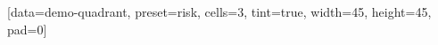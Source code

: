 \documentclass{article}
\begin{document}
\ExplSyntaxOn
\SemioVizProbeOn
\SemioVizChartsDryRun
{}
[data=demo-quadrant, preset=risk, cells=3, tint=true, width=45, height=45, pad=0]
\ExplSyntaxOff
\end{document}
